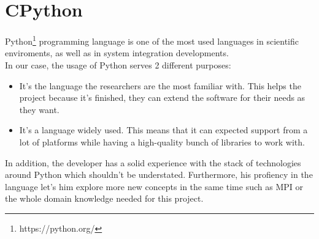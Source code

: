 \section{CPython}

Python\footnote{https://python.org/} programming language is one of the most used
languages in scientific enviroments, as well as in system integration developments.\\

In our case, the usage of Python serves 2 different purposes:
\begin{itemize}
  \item It's the language the researchers are the most familiar with. This
  helps the project because it's finished, they can extend the
  software for their needs as they want.
  \item It's a language widely used. This means that it can expected support
  from a lot of platforms while having a high-quality bunch of libraries to work
  with.
\end{itemize}


In addition, the developer has a solid experience with the stack of
technologies around Python which shouldn't be understated. Furthermore, his
profiency in the language let's him explore more new concepts in the same time
such as MPI or the whole domain knowledge needed for this project.\\
